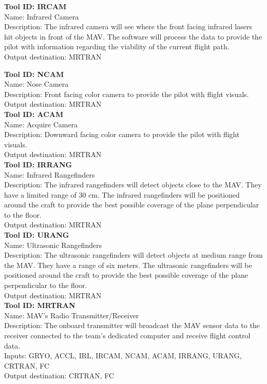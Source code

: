 \documentclass[onecolumn, oneside, letterpaper, draftclsnofoot, 10pt, compsoc]{IEEEtran}
\begin{document}
\noindent
\textbf{Tool ID: IRCAM}\\
Name: Infrared Camera\\
Description: The infrared camera will see where the front facing infrared lasers hit objects in front of the MAV. The software will process the data to provide the pilot with information regarding the viability of the current flight path.\\
Output destination: MRTRAN

\noindent
\textbf{Tool ID: NCAM}\\
Name: Nose Camera\\
Description: Front facing color camera to provide the pilot with flight visuals.\\
Output destination: MRTRAN\\

\noindent
\textbf{Tool ID: ACAM}\\
Name: Acquire Camera\\
Description: Downward facing color camera to provide the pilot with flight visuals.\\
Output destination: MRTRAN\\

\noindent
\textbf{Tool ID: IRRANG}\\
Name: Infrared Rangefinders\\
Description: The infrared rangefinders will detect objects close to the MAV. They have a limited range of 30 cm. The infrared rangefinders will be positioned around the craft to provide the best possible coverage of the plane perpendicular to the floor.\\
Output destination: MRTRAN\\

\noindent
\textbf{Tool ID: URANG}\\
Name: Ultrasonic Rangefinders\\
Description: The ultrasonic rangefinders will detect objects at medium range from the MAV. They have a range of six meters. The ultrasonic rangefinders will be positioned around the craft to provide the best possible coverage of the plane perpendicular to the floor.\\
Output destination: MRTRAN\\

\noindent
\textbf{Tool ID: MRTRAN}\\
Name: MAV’s Radio Transmitter/Receiver\\
Description: The onboard transmitter will broadcast the MAV sensor data to the receiver connected to the team’s dedicated computer and receive flight control data.\\
Inputs: GRYO, ACCL, IRL, IRCAM, NCAM, ACAM, IRRANG, URANG, CRTRAN, FC\\
Output destination: CRTRAN, FC\\
\end{document}
